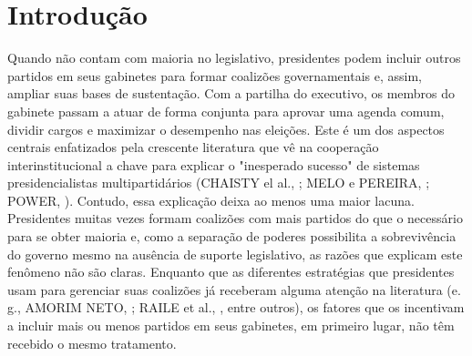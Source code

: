 \section{Introdução}
\label{sec:introduction}

Quando não contam com maioria no legislativo, presidentes podem incluir outros partidos em seus gabinetes para formar coalizões governamentais e, assim, ampliar suas bases de sustentação. Com a partilha do executivo, os membros do gabinete passam a atuar de forma conjunta para aprovar uma agenda comum, dividir cargos e maximizar o desempenho nas eleições. Este é um dos aspectos centrais enfatizados pela crescente literatura que vê na cooperação interinstitucional a chave para explicar o "inesperado sucesso" de sistemas presidencialistas multipartidários (CHAISTY el al., \citeyear{chaisty2014}; MELO e PEREIRA, \citeyear{melo2013}; POWER, \citeyear{power2010}). Contudo, essa explicação deixa ao menos uma maior lacuna. Presidentes muitas vezes formam coalizões com mais partidos do que o necessário para se obter maioria e, como a separação de poderes possibilita a sobrevivência do governo mesmo na ausência de suporte legislativo, as razões que explicam este fenômeno não são claras. Enquanto que as diferentes estratégias que presidentes usam para gerenciar suas coalizões já receberam alguma atenção na literatura (e. g., AMORIM NETO, \citeyear{neto2006}; RAILE et al., \citeyear{raile2010}, entre outros), os fatores que os incentivam a incluir mais ou menos partidos em seus gabinetes, em primeiro lugar, não têm recebido o mesmo tratamento.

